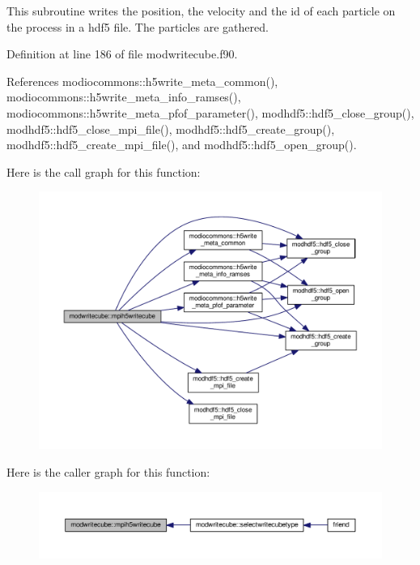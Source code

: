 This subroutine writes the position, the velocity and the id of each particle on the process in a hdf5 file. The particles are gathered. 



Definition at line 186 of file modwritecube.\-f90.



References modiocommons\-::h5write\-\_\-meta\-\_\-common(), modiocommons\-::h5write\-\_\-meta\-\_\-info\-\_\-ramses(), modiocommons\-::h5write\-\_\-meta\-\_\-pfof\-\_\-parameter(), modhdf5\-::hdf5\-\_\-close\-\_\-group(), modhdf5\-::hdf5\-\_\-close\-\_\-mpi\-\_\-file(), modhdf5\-::hdf5\-\_\-create\-\_\-group(), modhdf5\-::hdf5\-\_\-create\-\_\-mpi\-\_\-file(), and modhdf5\-::hdf5\-\_\-open\-\_\-group().



Here is the call graph for this function\-:\nopagebreak
\begin{figure}[H]
\begin{center}
\leavevmode
\includegraphics[width=350pt]{classmodwritecube_a0d94e39019f7808f3f373281ffe696a8_cgraph}
\end{center}
\end{figure}




Here is the caller graph for this function\-:\nopagebreak
\begin{figure}[H]
\begin{center}
\leavevmode
\includegraphics[width=350pt]{classmodwritecube_a0d94e39019f7808f3f373281ffe696a8_icgraph}
\end{center}
\end{figure}


